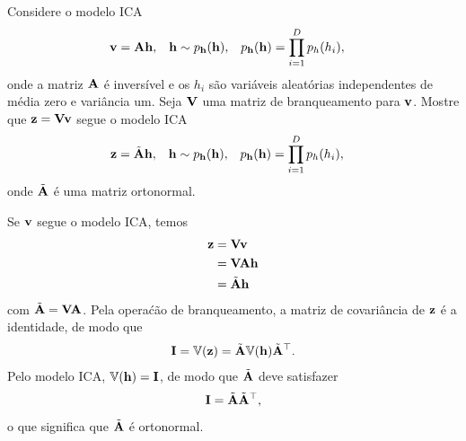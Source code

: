 \begin{exenumerate}
    \item Considere o modelo ICA
    \begin{align}
        \mathbf{v} &= \mathbf{A} \mathbf{h}, & \mathbf{h} &\sim p_{\mathbf{h}}(\mathbf{h}), &  p_{\mathbf{h}}(\mathbf{h})&= \prod_{i=1}^D p_h(h_i),
    \end{align}
    onde a matriz $\mathbf{A}$ \'e invers\'ivel e os $h_i$ s\~ao vari\'aveis
    aleat\'orias independentes de m\'edia zero e vari\^ancia um. Seja $\mathbf{V}$ uma
    matriz de branqueamento para $\mathbf{v}$. Mostre que $\mathbf{z} = \mathbf{V} \mathbf{v}$ segue o modelo ICA
    \begin{align}
        \mathbf{z} &= \tilde{\mathbf{A}} \mathbf{h}, & \mathbf{h} &\sim p_{\mathbf{h}}(\mathbf{h}), &  p_{\mathbf{h}}(\mathbf{h})&= \prod_{i=1}^D p_h(h_i),
    \end{align}
    onde $\tilde{\mathbf{A}}$ \'e uma matriz ortonormal.
    
    \begin{solution}
        Se $\mathbf{v}$ segue o modelo ICA, temos
        \begin{align}
            \mathbf{z} & = \mathbf{V} \mathbf{v}\\
            & = \mathbf{V} \mathbf{A} \mathbf{h}\\
            &= \tilde{\mathbf{A}} \mathbf{h}
        \end{align}
        com $\tilde{\mathbf{A}} = \mathbf{V} \mathbf{A}$. Pela opera\'c\~ao de branqueamento, a matriz de covari\^ancia de $\mathbf{z}$ \'e a identidade, de modo que
        \begin{align}
            \mathbf{I} = \mathbb{V}(\mathbf{z}) =  \tilde{\mathbf{A}} \mathbb{V}(\mathbf{h})  \tilde{\mathbf{A}}^{\top}.
        \end{align}
        Pelo modelo ICA, $\mathbb{V}(\mathbf{h}) = \mathbf{I}$, de modo que $\tilde{\mathbf{A}}$ deve satisfazer
        \begin{equation}
            \mathbf{I} =  \tilde{\mathbf{A}} \tilde{\mathbf{A}}^{\top},
        \end{equation}
        o que significa que $\tilde{\mathbf{A}}$ \'e ortonormal.
        

\end{solution}
\end{exenumerate}
